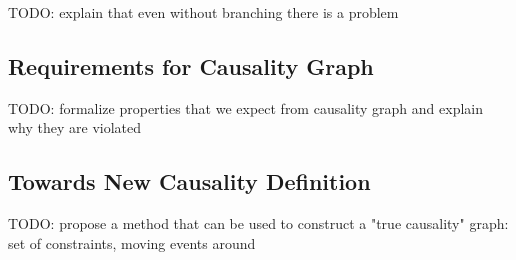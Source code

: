 TODO: explain that even without branching there is a problem

\subsection{Requirements for Causality Graph}

TODO: formalize properties that we expect from causality graph and explain why they are violated

\subsection{Towards New Causality Definition}

TODO: propose a method that can be used to construct a "true causality" graph: set of constraints, moving events around
